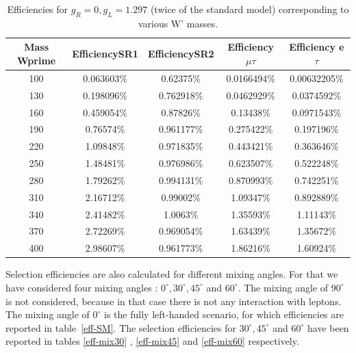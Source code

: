  \begin{table}[htb]
 	\centering
  	\begin{tabular}{|ccccc|}
  		\hline 
  		Mass Wprime  & EfficiencySR1  & EfficiencySR2 & Efficiency $\mu$$\tau$ & Efficiency e $\tau$ \\
 \hline 
100& 0.063603\%& 0.62375\%& 0.0166494\%& 0.00632205\%\\
130& 0.198096\%& 0.762918\%& 0.0462929\%& 0.0374592\%\\
160& 0.459054\%& 0.87826\%& 0.13438\%& 0.0971543\%\\
190& 0.76574\%& 0.961177\%& 0.275422\%& 0.197196\%\\
220& 1.09848\%& 0.971835\%& 0.443421\%& 0.363646\%\\
250& 1.48481\%& 0.976986\%& 0.623507\%& 0.522248\%\\
280& 1.79262\%& 0.994131\%& 0.870993\%& 0.742251\%\\
310& 2.16712\%& 0.99002\%& 1.09347\%& 0.892889\%\\
340& 2.41482\%& 1.0063\%& 1.35593\%& 1.11143\%\\
370& 2.72269\%&0.969054\%& 1.63439\%& 1.35672\%\\
400& 2.98607\%& 0.961773\%& 1.86216\%& 1.60924\%\\
  	
  	\hline
  	\end{tabular}
  	\caption{Efficiencies for $ g_R=0 , g_L=1.297 $ (twice of the standard model) corresponding to various W' masses. \label{eff-twice} }
  \end{table}


Selection efficiencies are also calculated for different mixing angles. For that we have considered four mixing angles : $0^\circ, 30^\circ, 45^\circ$ and $60^\circ$. The mixing angle of $90^\circ$ is not considered, because in that case there is not any interaction with leptons. The mixing angle of $0^\circ$ is the fully left-handed scenario, for which efficiencies are reported in table~\ref{eff-SM}.  The selection efficiencies for  $30^\circ, 45^\circ$ and $60^\circ$ have been reported in tables \ref{eff-mix30} , \ref{eff-mix45} and \ref{eff-mix60} respectively.

